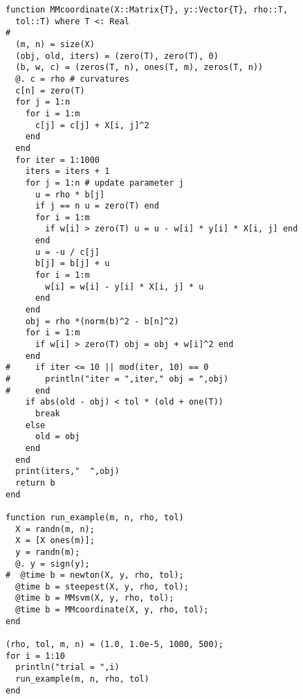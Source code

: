 \documentclass[11pt]{article}
\begin{document}
\begin{verbatim}
function MMcoordinate(X::Matrix{T}, y::Vector{T}, rho::T,
  tol::T) where T <: Real
#
  (m, n) = size(X)
  (obj, old, iters) = (zero(T), zero(T), 0)
  (b, w, c) = (zeros(T, n), ones(T, m), zeros(T, n))
  @. c = rho # curvatures
  c[n] = zero(T) 
  for j = 1:n
    for i = 1:m
      c[j] = c[j] + X[i, j]^2
    end
  end
  for iter = 1:1000
    iters = iters + 1
    for j = 1:n # update parameter j
      u = rho * b[j]
      if j == n u = zero(T) end
      for i = 1:m
        if w[i] > zero(T) u = u - w[i] * y[i] * X[i, j] end
      end
      u = -u / c[j]
      b[j] = b[j] + u
      for i = 1:m
        w[i] = w[i] - y[i] * X[i, j] * u
      end
    end      
    obj = rho *(norm(b)^2 - b[n]^2)
    for i = 1:m
      if w[i] > zero(T) obj = obj + w[i]^2 end
    end
#     if iter <= 10 || mod(iter, 10) == 0 
#       println("iter = ",iter," obj = ",obj)
#     end
    if abs(old - obj) < tol * (old + one(T))
      break
    else
      old = obj
    end  
  end
  print(iters,"  ",obj)
  return b
end

function run_example(m, n, rho, tol)
  X = randn(m, n);
  X = [X ones(m)];
  y = randn(m);
  @. y = sign(y);
#  @time b = newton(X, y, rho, tol);
  @time b = steepest(X, y, rho, tol);
  @time b = MMsvm(X, y, rho, tol);
  @time b = MMcoordinate(X, y, rho, tol);
end

(rho, tol, m, n) = (1.0, 1.0e-5, 1000, 500);
for i = 1:10
  println("trial = ",i)
  run_example(m, n, rho, tol)
end
\end{verbatim}

\begin{thebibliography}{99}
\end{thebibliography}
\end{document}
